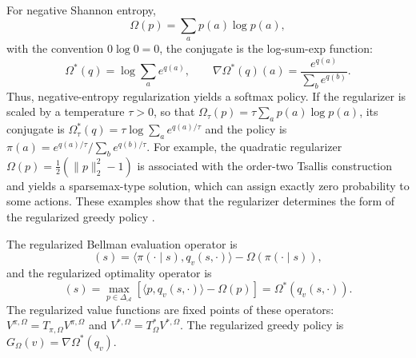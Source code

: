 For negative Shannon entropy,
\begin{equation}
    \Omega(p)=\sum_a p(a)\log p(a),
    \label{eq:rl-negative-entropy}
\end{equation}
with the convention $0\log0=0$, the conjugate is the log-sum-exp function:
\begin{equation}
    \Omega^*(q)=\log\sum_a e^{q(a)},
    \qquad
    \nabla\Omega^*(q)(a)
    =\frac{e^{q(a)}}{\sum_b e^{q(b)}}.
    \label{eq:rl-softmax-conjugate}
\end{equation}
Thus, negative-entropy regularization yields a softmax policy. If the regularizer
is scaled by a temperature $\tau>0$, so that $\Omega_\tau(p)=
\tau\sum_a p(a)\log p(a)$, its conjugate is
$\Omega_\tau^*(q)=\tau\log\sum_a e^{q(a)/\tau}$ and the policy is
$\pi(a)=e^{q(a)/\tau}/\sum_b e^{q(b)/\tau}$. For example, the quadratic regularizer
$\Omega(p)=\tfrac{1}{2}(\|p\|_2^2-1)$ is associated with the order-two
Tsallis construction and yields a sparsemax-type solution, which can assign
exactly zero probability to some actions. These examples show that the regularizer
 determines the form of the regularized greedy policy
\parencite{geist2019regularized}.

The regularized Bellman evaluation operator is
\begin{equation}
    [T_{\pi,\Omega}v](s)
    =\langle\pi(\cdot\mid s),q_v(s,\cdot)\rangle
     -\Omega(\pi(\cdot\mid s)),
    \label{eq:rl-regularized-evaluation}
\end{equation}
and the regularized optimality operator is
\begin{equation}
    [T^*_{\Omega}v](s)
    =\max_{p\in\Delta_{\mathcal A}}
      \left[\langle p,q_v(s,\cdot)\rangle-\Omega(p)\right]
    =\Omega^*(q_v(s,\cdot)).
    \label{eq:rl-regularized-optimality}
\end{equation}
The regularized value functions are fixed points of these operators:
$V^{\pi,\Omega}=T_{\pi,\Omega}V^{\pi,\Omega}$ and
$V^{*,\Omega}=T^*_{\Omega}V^{*,\Omega}$. The regularized greedy policy is
$G_\Omega(v)=\nabla\Omega^*(q_v)$.


